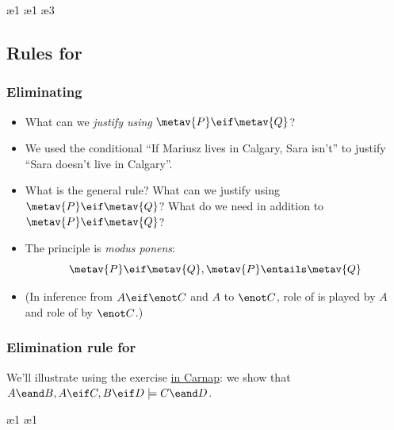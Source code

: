 \begin{frame}
  \begin{fitchproof}
    \ae{1}
    \ae{1}
    \ae{3}
  \end{fitchproof}
\end{frame}


\newhourlecture
\subsection{Rules for \eif}

\begin{frame}
  \frametitle{Eliminating \eif}

  \begin{itemize}[<+->]
    \item What can we \emph{justify using} $\metav{P} \eif \metav{Q}$?
    \item We used the conditional ``If Mariusz lives in Calgary, Sara
    isn't'' to justify ``Sara doesn't live in
    Calgary''.
    \item What is the general rule? What can we justify using
    $\metav{P} \eif \metav{Q}$? What do we need in addition to $\metav{P} \eif \metav{Q}$?
    \item The principle is \emph{modus ponens}:
    \[ \metav{P} \eif \metav{Q}, \metav{P} \entails \metav{Q}\]
    \item (In inference from $A \eif \enot C$ and $A$ to $\enot C$, role
    of  is played by $A$ and role of  by $\enot C$.)
  \end{itemize}
\end{frame}

\begin{frame}
  \frametitle{Elimination rule for \eif}
  \begin{fitchproof}
     
  \end{fitchproof}

  We'll illustrate using the exercise
  \href{https://carnap.io/shared/rzach@ucalgary.ca/Practice\%20Problems\%20IV.md}{in
  Carnap}: we
  show that $A \eand B, A \eif C, B \eif D \models C \eand D$.
\end{frame}

\begin{frame}
  \begin{fitchproof}
    \ae{1}
    \ae{1}
  \end{fitchproof}
\end{frame}

